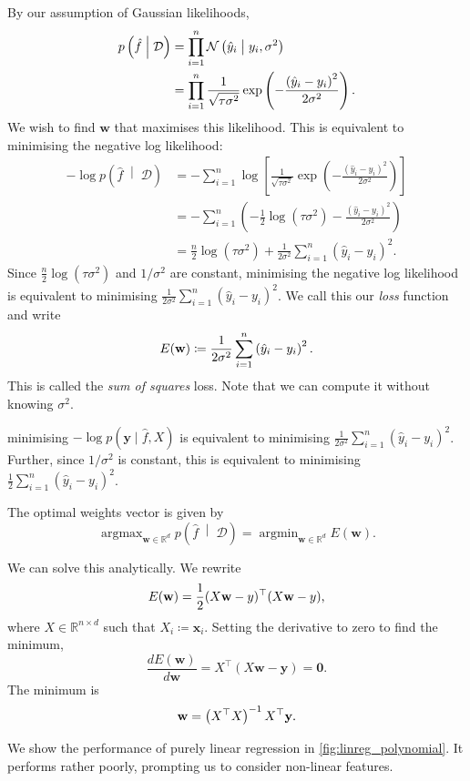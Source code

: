 \documentclass[11pt,twoside,openright]{report}
\newcommand\bbR{\mathbb{R}}
\newcommand\bw{\mathbf{w}}
\newcommand\bx{\mathbf{x}}
\newcommand\by{\mathbf{y}}
\newcommand\cD{\mathcal{D}}
\newcommand\cN{\mathcal{N}}
\DeclareMathOperator*{\argmax}{argmax}
\DeclareMathOperator*{\argmin}{argmin}
\begin{document}
By our assumption of Gaussian likelihoods, \begin{align}
    p\left(\hat f \;\middle|\; \cD\right) &= \prod_{i = 1}^{n} \cN\left(\hat y_i \;\middle|\; y_i, \sigma^2\right) \label{eq:linearlikelihood} \\
    &= \prod_{i = 1}^{n} \frac{1}{\sqrt{\tau\sigma^2}} \exp\left(-\frac{\left(\hat y_i - y_i\right)^2}{2\sigma^2}\right) \text. \nonumber
\end{align} We wish to find $\bw$ that maximises this likelihood. This is equivalent to minimising the negative log likelihood:\begin{align*}
    -\log p\left(\hat f \;\middle|\; \cD\right)
    &= - \sum_{i = 1}^{n} \log\left[\frac{1}{\sqrt{\tau\sigma^2}} \exp\left(-\frac{\left(\hat y_i - y_i\right)^2}{2\sigma^2}\right)\right] \\
    &= - \sum_{i = 1}^{n} \left(-\frac{1}{2}\log\left(\tau\sigma^2\right) -\frac{\left(\hat y_i - y_i\right)^2}{2\sigma^2}\right) \\
    &=  \frac{n}{2}\log\left(\tau\sigma^2\right) + \frac{1}{2\sigma^2}\sum_{i = 1}^{n}\left(\hat y_i - y_i\right)^2 \text{.}
\end{align*} Since $\frac{n}{2}\log(\tau\sigma^2)$ and $1/\sigma^2$ are constant, minimising the negative log likelihood is equivalent to minimising $\frac{1}{2\sigma^2}\sum_{i = 1}^{n}(\hat y_i - y_i)^2$. We call this our \emph{loss} function and write \[
  E(\bw) \coloneqq \frac{1}{2\sigma^2}\sum_{i = 1}^{n}\left(\hat y_i - y_i\right)^2 \text.
\] This is called the \emph{sum of squares} loss. Note that we can compute it without knowing $\sigma^2$.

 minimising $-\log p(\by \mid \hat f, X)$ is equivalent to minimising $\frac{1}{2\sigma^2}\sum_{i = 1}^{n}(\hat y_i - y_i)^2$. Further, since $1/\sigma^2$ is constant, this is equivalent to minimising $\frac12\sum_{i = 1}^{n}(\hat y_i - y_i)^2$.

The optimal weights vector is given by \[
    \argmax_{\bw \in \bbR^d} p\left(\hat f \;\middle|\; \cD\right) = \argmin_{\bw \in \bbR^d} E(\bw) \text{.}
\]

We can solve this analytically. We rewrite \[
  E(\bw) = \frac12(X\bw - y)^\top(X\bw - y) \text,
\] where $X \in \bbR^{n\times d}$ such that $X_i \coloneqq \bx_i$. Setting the derivative to zero to find the minimum, \[
    \frac{dE(\bw)}{d\bw} = X^\top (X\bw - \by) = \mathbf{0} \text{.}
\] The minimum is \[
    \bw  = \left(X^\top X\right)^{-1}X^\top\by \text.
\]

We show the performance of purely linear regression in \cref{fig:linreg_polynomial}. It performs rather poorly, prompting us to consider non-linear features.
\end{document}

